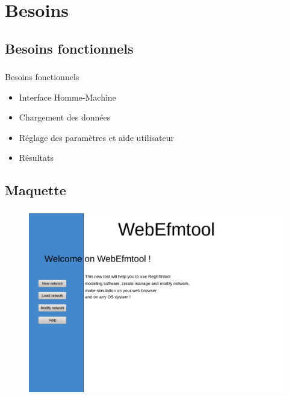 \documentclass[11pt]{beamer}
\begin{document}
\section{Besoins	}	

\subsection{Besoins fonctionnels}

\begin{frame}
	\frametitle{\subsecname}
	\begin{block}{Besoins fonctionnels}
		\begin{itemize}
		\item Interface Homme-Machine
		\item Chargement des données
		\item Réglage des paramètres et aide utilisateur
		\item Résultats
		\end{itemize}
	\end{block}
\end{frame}

\subsection{Maquette}

\begin{frame}
	\frametitle{\subsecname}
	\begin{figure}[h]
		\includegraphics[scale=0.25]{Accueil.png}
	 \end{figure}
\end{frame}
\end{document}

